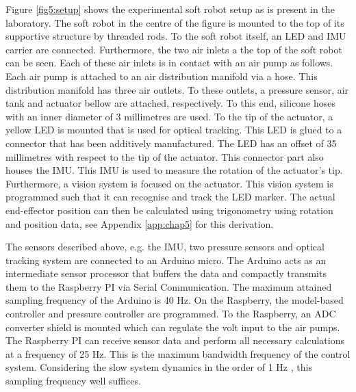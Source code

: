 Figure \ref{fig5:setup} shows the experimental soft robot setup as is present in the laboratory. The soft robot in the centre of the figure is mounted to the top of its supportive structure by threaded rods. To the soft robot itself, an LED and IMU carrier are connected. Furthermore, the two air inlets a the top of the soft robot can be seen. Each of these air inlets is in contact with an air pump as follows. Each air pump is attached to an air distribution manifold via a hose. This distribution manifold has three air outlets. To these outlets, a pressure sensor, air tank and actuator bellow are attached, respectively. To this end, silicone hoses with an inner diameter of 3 millimetres are used. To the tip of the actuator, a yellow LED is mounted that is used for optical tracking. This LED is glued to a connector that has been additively manufactured. The LED has an offset of 35 millimetres with respect to the tip of the actuator. This connector part also houses the IMU. This IMU is used to measure the rotation of the actuator's tip. Furthermore, a vision system is focused on the actuator. This vision system is programmed such that it can recognise and track the LED marker. The actual end-effector position can then be calculated using trigonometry using rotation and position data, see Appendix \ref{app:chap5} for this derivation.


The sensors described above, e.g. the IMU, two pressure sensors and optical tracking system are connected to an Arduino micro. The Arduino acts as an intermediate sensor processor that buffers the data and compactly transmits them to the Raspberry PI via Serial Communication. The maximum attained sampling frequency of the Arduino is 40 Hz. On the Raspberry, the model-based controller and pressure controller are programmed. To the Raspberry, an ADC converter shield is mounted which can regulate the volt input to the air pumps. The Raspberry PI can receive sensor data and perform all necessary calculations at a frequency of 25 Hz. This is the maximum bandwidth frequency of the control system. Considering the slow system dynamics in the order of 1 Hz \cite{tawk2018bioinspired},\cite{HighBandwidthControl} this sampling frequency well suffices.


